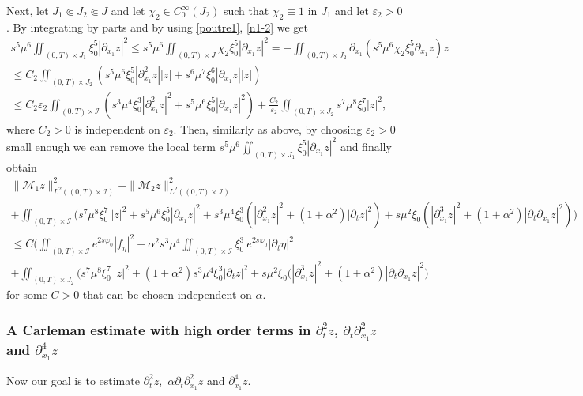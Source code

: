 \documentclass[a4paper, 12pt]{article}
\theoremstyle{plain}
\theoremstyle{definition}
\numberwithin{theorem}{section}
\numberwithin{equation}{section}
\begin{document}
{Next, let $J_1\Subset J_2 \Subset J$ and let $\chi_2\in C_0^\infty(J_2)$ such that $\chi_2\equiv 1$ in $J_1$ and let $\varepsilon_2>0$. By integrating by parts and by using \eqref{poutre1}, \eqref{n1-2} we get 
\begin{multline*}
    s^5\mu^6 \iint_{(0,T)\times J_1}\xi_0^5|\partial_{x_1}z|^2\leq s^5\mu^6 \iint_{(0,T)\times J}\chi_2\xi_0^5|\partial_{x_1}z|^2= - \iint_{(0,T)\times J_2}\partial_{x_1}(s^5\mu^6\chi_2\xi_0^5\partial_{x_1}z) z\\
    \leq C_2\iint_{(0,T)\times J_2}(s^5\mu^6\xi_0^5|\partial_{x_1}^2 z||z|+s^6\mu^7\xi_0^{6}|\partial_{x_1}z||z|) \\
    \leq C_2 \varepsilon_2 \iint_{(0,T)\times\mathcal{I}}(s^3\mu^4\xi_0^3|\partial_{x_1}^2 z|^2
    +s^5\mu^6\xi_0^5|\partial_{x_1}z|^2)+\frac{C_2}{\varepsilon_2} \iint_{(0,T)\times J_2}s^7\mu^8\xi_0^7|z|^2,
\end{multline*}
where $C_2>0$ is independent on $\varepsilon_2$. Then, similarly as above, by choosing $\varepsilon_2>0$ small enough we can remove the local term $s^5\mu^6 \iint_{(0,T)\times J_1}\xi_0^5|\partial_{x_1}z|^2$ and finally obtain
\begin{multline}\label{midle-estimate2}
\|\mathcal{M}_1z\|^2_{L^2((0,T)\times\mathcal{I})}+\|\mathcal{M}_2z\|^2_{L^2((0,T)\times\mathcal{I})}\\
+ \iint_{(0,T)\times\mathcal{I}}\Big(s^7\mu^8\xi^7_0~|z|^2+s^5\mu^6\xi_0^5|\partial_{x_1}z|^2+s^3\mu^4\xi_0^3(|\partial^2_{x_1}z|^2+(1+\alpha^2)|\partial_tz|^2)  +s\mu^2\xi_0(|\partial^3_{x_1}z|^2+(1+\alpha^2)|\partial_t\partial_{x_1}z|^2)\Big)\\
\leq C\Big(\iint_{(0,T)\times\mathcal{I}}e^{2s\varphi_0}|f_\eta|^2+\alpha^2s^3\mu^4\iint_{(0,T)\times\mathcal{I}}\xi_0^3~e^{2s\varphi_0}|\partial_t \eta|^2\\
+\iint_{(0,T)\times J_2}\Big(s^7\mu^8\xi^7_0~|z|^2+(1+\alpha^2)s^3\mu^4\xi_0^3 |\partial_tz|^2+s\mu^2\xi_0(|\partial^3_{x_1}z|^2+(1+\alpha^2)|\partial_t\partial_{x_1}z|^2\Big)
\end{multline}
for some $C>0$ that can be chosen independent on $\alpha$.

\subsubsection{A Carleman estimate with high order terms in  \texorpdfstring{$\partial^2_tz$}{dt2}, \texorpdfstring{$\partial_t\partial^2_{x_1}z$}{dtdx2} and \texorpdfstring{$\partial^4_{x_1}z$}{dx4}}
Now our goal is to estimate $\partial^2_tz,$ $\alpha\partial_t\partial^2_{x_1}z$ and $\partial^4_{x_1}z.$ 

}
\end{document}

